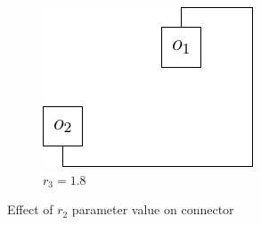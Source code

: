 \documentclass[a4paper,12pt]{report}
\begin{document}
\begin{figure}
\begin{subfigure}{.33\textwidth}
    \centering
    \includegraphics[width=0.9\linewidth]{connectorExample_r3_1_8.pdf}
    \caption{$r_3=1.8$}
  \end{subfigure}

  \caption{Effect of $r_2$ parameter value on connector}
  \label{fig:r3_connectorExample}
\end{figure}
\end{document}

